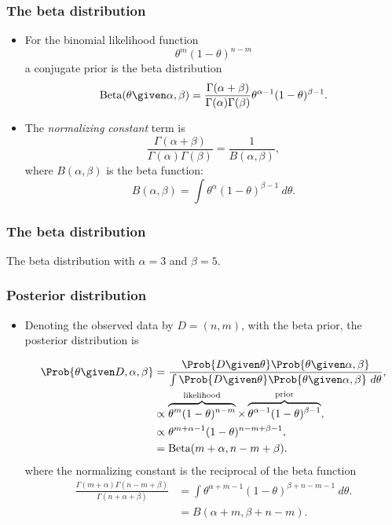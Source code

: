 \documentclass{slides}
\begin{document}
\begin{frame}
	\frametitle{The beta distribution}
	\begin{itemize}
		\item For the binomial likelihood function
\[
	\theta^m (1-\theta)^{n-m}	
\]
a conjugate prior is the beta distribution
\[
	\textrm{Beta}(\theta \given \alpha, \beta) = \frac{\Gamma(\alpha + \beta)}{\Gamma(\alpha)\Gamma(\beta)} \theta^{\alpha-1}(1 - \theta)^{\beta-1}.
\]
\item The \emph{normalizing constant} term is
	\[
		\frac{\Gamma(\alpha + \beta)}{\Gamma(\alpha)\Gamma(\beta)} = \frac{1}{B(\alpha,\beta)},
	\]
	where $B(\alpha,\beta)$ is the beta function:
	\[
		B(\alpha,\beta) = \int \theta^\alpha (1-\theta)^{\beta-1}\ d\theta.
	\]
	\end{itemize}
\end{frame}
\begin{frame}
	\frametitle{The beta distribution}
	
	The beta distribution with $\alpha=3$ and $\beta=5$.
\end{frame}
\begin{frame}
	\frametitle{Posterior distribution}
	\begin{itemize}
		\item Denoting the observed data by $D = (n, m)$, with the beta prior, the posterior distribution is 

		\begin{align*}
			\Prob{\theta\given D, \alpha,\beta} &= \frac{\Prob{D\given\theta}\Prob{\theta\given\alpha,\beta}}{\int\Prob{D\given\theta}\Prob{\theta\given\alpha,\beta}\ d\theta},\\
			&\propto \overbrace{\theta^{m} (1-\theta)^{n-m}}^{\text{likelihood}} \times \overbrace{\theta^{\alpha-1}(1 - \theta)^{\beta-1}}^{\text{prior}},\\
			&\propto \theta^{m + \alpha-1}(1 - \theta)^{n-m+\beta-1},\\
			&= \textrm{Beta}(m + \alpha, n - m + \beta).
		\end{align*}
		where the normalizing constant is the reciprocal of the beta function 
		\begin{align*}
			\frac{\Gamma(m + \alpha)\Gamma(n - m + \beta)}{\Gamma(n + \alpha+\beta)} &= \int \theta^{\alpha + m - 1} (1-\theta)^{ \beta + n - m - 1}\ d\theta.\\
			&=B(\alpha + m, \beta + n - m).
		\end{align*}

	\end{itemize}
\end{frame}
\end{document}
